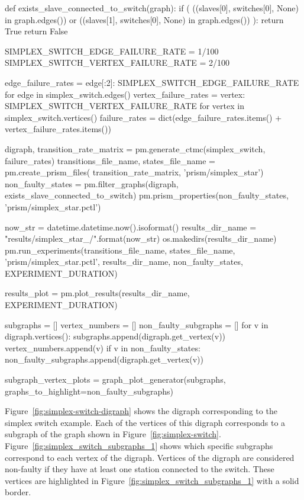 \documentclass[times,a4paper,10pt,twocolumn]{article}
\theoremstyle{definition}
\theoremstyle{definition}
\theoremstyle{plain}
\begin{document}
\begin{sagesilent}

def exists_slave_connected_to_switch(graph):
    if ( ((slaves[0], switches[0], None) in graph.edges()) or
            ((slaves[1], switches[0], None) in graph.edges()) ):
        return True
    return False

SIMPLEX_SWITCH_EDGE_FAILURE_RATE = 1/100
SIMPLEX_SWITCH_VERTEX_FAILURE_RATE = 2/100

edge_failure_rates = {edge[:2]: SIMPLEX_SWITCH_EDGE_FAILURE_RATE
    for edge in simplex_switch.edges()}
vertex_failure_rates = {vertex: SIMPLEX_SWITCH_VERTEX_FAILURE_RATE
    for vertex in simplex_switch.vertices()}
failure_rates = dict(edge_failure_rates.items() + vertex_failure_rates.items())

digraph, transition_rate_matrix = pm.generate_ctmc(simplex_switch,
    failure_rates)
transitions_file_name, states_file_name = pm.create_prism_files(
    transition_rate_matrix, 'prism/simplex_star')
non_faulty_states = pm.filter_graphs(digraph,
    exists_slave_connected_to_switch)
pm.prism_properties(non_faulty_states, 'prism/simplex_star.pctl')

now_str = datetime.datetime.now().isoformat()
results_dir_name = "results/simplex_star_{}/".format(now_str)
os.makedirs(results_dir_name)
pm.run_experiments(transitions_file_name, states_file_name,
    'prism/simplex_star.pctl', results_dir_name,
    non_faulty_states, EXPERIMENT_DURATION)

results_plot = pm.plot_results(results_dir_name, EXPERIMENT_DURATION)

subgraphs = []
vertex_numbers = []
non_faulty_subgraphs = []
for v in digraph.vertices():
    subgraphs.append(digraph.get_vertex(v))
    vertex_numbers.append(v)
    if v in non_faulty_states:
        non_faulty_subgraphs.append(digraph.get_vertex(v))

subgraph_vertex_plots = graph_plot_generator(subgraphs,
    graphs_to_highlight=non_faulty_subgraphs)


\end{sagesilent}

Figure~\ref{fig:simplex-switch-digraph} shows the digraph corresponding to the
simplex switch example. Each of the vertices of this digraph corresponds to a
subgraph of the graph shown in Figure~\ref{fig:simplex-switch}.
Figure~\ref{fig:simplex_switch_subgraphs_1} shows which specific subgraphs
correspond to each vertex of the digraph. Vertices of the digraph are
considered non-faulty if they have at least one station connected to the
switch. These vertices are highlighted in
Figure~\ref{fig:simplex_switch_subgraphs_1} with a solid border.
\end{document}
